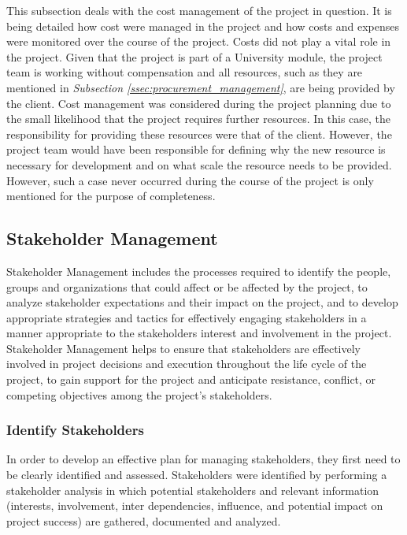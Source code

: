 This subsection deals with the cost management of the project in question. It is being detailed how cost were managed in the project and how costs and expenses were monitored over the course of the project.
\newline
Costs did not play a vital role in the project. Given that the project is part of a University module, the project team is working without compensation and all resources, such as they are mentioned in \textit{Subsection \ref{ssec:procurement_management}}, are being provided by the client.
\newline
Cost management was considered during the project planning due to the small likelihood that the project requires further resources. In this case, the responsibility for providing these resources were that of the client. However, the project team would have been responsible for defining why the new resource is necessary for development and on what scale the resource needs to be provided. However, such a case never occurred during the course of the project is only mentioned for the purpose of completeness.



\subsection{Stakeholder Management}
\label{ssec:stakeholder_management}

Stakeholder Management includes the processes required to identify the people, groups and organizations that could affect or be affected by the project, to analyze stakeholder expectations and their impact on the project, and to develop appropriate strategies and tactics for effectively engaging stakeholders in a manner appropriate to the stakeholders interest and involvement in the project. Stakeholder Management helps to ensure that stakeholders are effectively involved in project decisions and execution throughout the life cycle of the project, to gain support for the project and anticipate resistance, conflict, or competing objectives among the project’s stakeholders.

\subsubsection{Identify Stakeholders}
\label{sssec:identify_stakeholders}

In order to develop an effective plan for managing stakeholders, they first need to be clearly identified and assessed. Stakeholders were identified by performing a stakeholder analysis in which potential stakeholders and relevant information (interests, involvement, inter dependencies, influence, and potential impact on project success) are gathered, documented and analyzed. 


